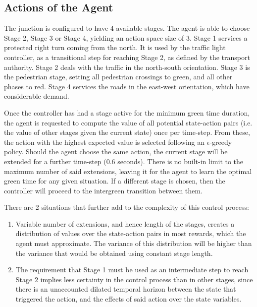 \documentclass[conference]{IEEEtran}
\begin{document}
\subsection{Actions of the Agent}
The junction is configured to have 4 available stages. 
The agent is able to choose Stage 2, Stage 3 or Stage 4, yielding an action space size of 3.
Stage 1 services a protected right turn coming from the north. It is used by the traffic light controller, as a transitional step for reaching Stage 2, as defined by the transport authority.
Stage 2 deals with the traffic in the north-south orientation.
Stage 3 is the pedestrian stage, setting all pedestrian crossings to green, and all other phases to red.
Stage 4 services the roads in the east-west orientation, which have considerable demand.

Once the controller has had a stage active for the minimum green time duration, the agent is requested to compute the value of all potential state-action pairs (i.e. the value of other stages given the current state) once per time-step.
From these, the action with the highest expected value is selected following an $\epsilon$-greedy policy\cite{suttonbarto}.
Should the agent choose the same action, the current stage will be extended for a further time-step (0.6 seconds).
There is no built-in limit to the maximum number of said extensions, leaving it for the agent to learn the optimal green time for any given situation.
If a different stage is chosen, then the controller will proceed to the intergreen transition between them.

There are 2 situations that further add to the complexity of this control process:
\begin{enumerate}
\item Variable number of extensions, and hence length of the stages, creates a distribution of values over the state-action pairs in most rewards, which the agent must approximate. The variance of this distribution will be higher than the variance that would be obtained using constant stage length.
\item The requirement that Stage 1 must be used as an intermediate step to reach Stage 2 implies less certainty in the control process than in other stages, since there is an unaccounted dilated temporal horizon between the state that triggered the action, and the effects of said action over the state variables.
\end{enumerate}
\end{document}
